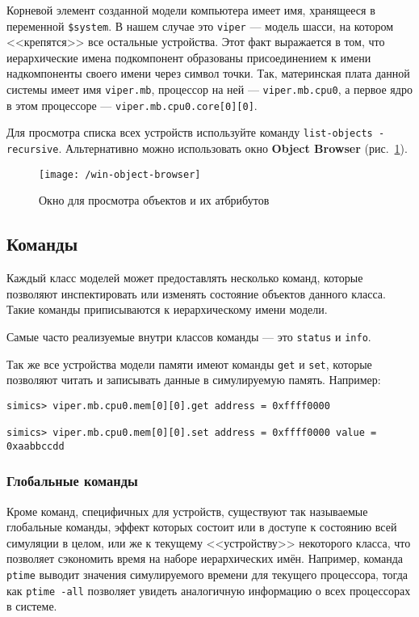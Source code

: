Корневой элемент созданной модели компьютера имеет имя, хранящееся в переменной \texttt{\$system}. В нашем случае это \texttt{viper} --- модель шасси, на котором <<крепятся>> все остальные устройства. Этот факт выражается в том, что иерархические имена подкомпонент образованы присоединением к имени надкомпоненты своего имени через символ точки. Так, материнская плата данной системы имеет имя \texttt{viper.mb}, процессор на ней --- \texttt{viper.mb.cpu0}, а первое ядро в этом процессоре --- \texttt{viper.mb.cpu0.core[0][0]}.

Для просмотра списка всех устройств используйте команду \texttt{list-objects -recursive}. Альтернативно можно использовать окно \textbf{Object Browser} (рис.~\ref{fig:object-browser}).

\begin{figure}[htb]
    \centering
    \texttt{[image: /win-object-browser]}
    \caption{Окно для просмотра объектов и их атбрибутов}
    \label{fig:object-browser}
\end{figure}


\subsection{Команды}

Каждый класс моделей может предоставлять несколько команд, которые позволяют инспектировать или изменять состояние объектов данного класса. Такие команды приписываются к иерархическому имени модели.

Самые часто реализуемые внутри классов команды --- это \texttt{status} и \texttt{info}.

Так же все устройства модели памяти имеют команды \texttt{get} и \texttt{set}, которые позволяют читать и записывать данные в симулируемую память. Например:

\begin{lstlisting}
simics> viper.mb.cpu0.mem[0][0].get address = 0xffff0000

simics> viper.mb.cpu0.mem[0][0].set address = 0xffff0000 value = 0xaabbccdd
\end{lstlisting}


\subsubsection{Глобальные команды}

Кроме команд, специфичных для устройств, существуют так называемые глобальные команды, эффект которых состоит или в доступе к состоянию всей симуляции в целом, или же к текущему <<устройству>> некоторого класса, что позволяет сэкономить время на наборе иерархических имён. Например, команда \texttt{ptime} выводит значения симулируемого времени для текущего процессора, тогда как \texttt{ptime -all} позволяет увидеть аналогичную информацию о всех процессорах в системе.

